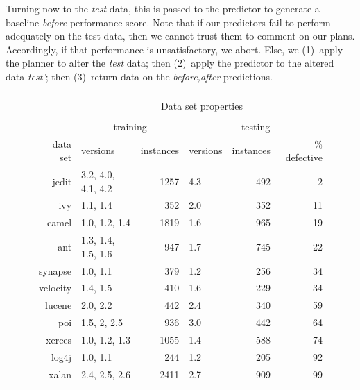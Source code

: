 \documentclass[conference]{IEEEtran}
\begin{document}
Turning now to the {\em test} data, this is passed to the { predictor}
to generate a baseline {\em before} performance score.
Note that if our { predictors} fail to perform adequately on the test data,
then we cannot trust them to comment on our plans. Accordingly,
if that performance is unsatisfactory, we abort.
Else, we (1)~apply the { planner} to alter the {\em test} data;
then (2)~apply the { predictor} to the altered data {\em test'};
then (3)~return data on the {\em before,after} predictions.




\begin{figure}[!t]
\scriptsize
   \begin{center}
   \begin{minipage}{.46\linewidth}
    \begin{tabular}{r@{~}|l@{~}|r@{~}|l@{~}|r@{~}|r@{~}|} \cline{2-6}
   & \multicolumn{5}{c|}{ }\\ 
   
   & \multicolumn{5}{c|}{ Data set  properties}\\ 
   & \multicolumn{5}{c|}{  }\\ 
           & \multicolumn{2}{c|}{training}   & \multicolumn{3}{c|}{testing}      \\ \cline{2-6}
   data set      & versions           & instances & versions     & instances    & \% defective             \\ \hline
        jedit    & 3.2, 4.0, 4.1, 4.2 & 1257      & 4.3          & 492          & 2 \\
        ivy      & 1.1, 1.4           & 352       & 2.0          & 352          & 11 \\
        camel    & 1.0, 1.2, 1.4      & 1819      & 1.6          & 965          & 19 \\
        ant      & 1.3, 1.4, 1.5, 1.6 & 947       & 1.7          & 745          & 22 \\
        synapse  & 1.0, 1.1           & 379       & 1.2          & 256          & 34 \\
        velocity & 1.4, 1.5           & 410       & 1.6          & 229          & 34 \\
        lucene   & 2.0, 2.2           & 442       & 2.4          & 340          & 59 \\
        poi      & 1.5, 2, 2.5        & 936       & 3.0          & 442          & 64 \\
        xerces   & 1.0, 1.2, 1.3      & 1055      & 1.4          & 588          & 74  \\ 
        log4j    & 1.0, 1.1           & 244       & 1.2          & 205          & 92   \\
        xalan    & 2.4, 2.5, 2.6      & 2411      & 2.7          & 909          & 99  \\\hline 
        

\end{tabular}
\end{minipage}
\end{center}
\end{figure}
\end{document}
